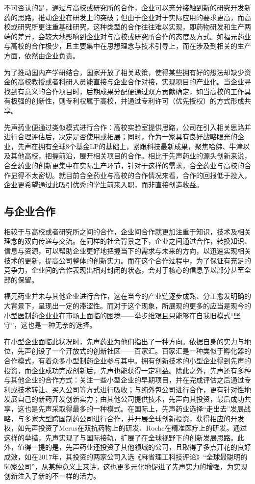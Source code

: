 \documentclass[twocolumn,openany]{ctexbook}
\begin{document}
			不可否认的是，通过与高校或研究所的合作，企业可以充分接触到新的研究开发新药的思路，推动企业在研发上的突破；但由于企业对于实际应用的要求更高，而高校或研究所更注重基础研究，这种类型的合作往往难以实现，即药物研发和生产两端的差异，会较大地影响到企业对与高校或研究所合作的态度及方式。如福元药业与高校的合作极少，且主要集中在思想理念与技术引导上，而在涉及到相关的生产方面，依然由企业负责。
			
			为了推动国内产学研结合，国家开放了相关政策，使得某些拥有好的想法却缺少资金的高校教授或者科研人员能直接与企业合作对接，实现项目的产业化。当企业寻找到有意义的合作项目时，后期成果分配便通过双方贡献确定，如当高校的工作具有极强的创新性，则专利权属于高校，并通过专利许可（优先授权）的方式形成共享。
			
			先声药业便通过类似模式进行合作：高校实验室提供思路，公司在引入相关思路并进行合理评估后，决定是否使用或拓展；同时，作为一家具有良好战略眼光的企业，先声在拥有全球8个基金LP的基础上，紧跟科技最新成果，聚焦哈佛、牛津以及其他高校，把握前沿，展开相关项目的合作。相比于先声药业的源头创新来说，合全药业的创新更集中在实际生产环节，针对于这样的需求，合全药业与高校的合作显得不太密切。就目前合全药业与高校的合作情况来看，合作的回报低于投入，企业更希望通过此吸引优秀的学生前来入职，而非直接创造收益。
			
			
			\subsection{与企业合作}
			
			相较于与高校或者研究所之间的合作，企业间合作就更加注重于知识，技术及相关理念的双向传递与交流。在同样的社会背景之下，企业之间通过合作，转换知识、信息与资源，可以帮助企业更好地把握当下的需求与未来的方向，以迅速实现相关技术的更新，提高公司整体的创新实力。而在这个合作过程中，为了保证有充足的竞争力，企业间的合作表现出相对封闭的状态，会对于核心的信息予以部分甚至全部的保留。
			
			福元药业并未与其他企业进行合作，这在当今的产业链逐步成熟、分工愈发明确的大背景下，呈现出一定的滞涩性。而对于这个现象，所展现的更多的应当是现今的小型医制药企业业在市场上面临的困境——举步维艰且只能够在自我旧模式“坚守”，这也是一种无奈的选择。
			
			在小型企业面临此状况时，先声药业为他们指出了一种方向。依据自身的实力与地位，先声创设了一个开放式的创新社区——百家汇。百家汇是一种类似于孵化器的合作模式，有着众多小型制药企业参与其中。拥有创新技术的小型企业得到先声的投资，而企业成功完成创新后，先声也能获得一定利益。除此之外，先声还有多种与其他企业的合作方式：关注一些小型企业的早期项目，并在完成评估之后通过专利或技术转让、买入公司等方式进行吸收；与纯外包公司进行合作，更有针对性地发展自己的新药开发创新实力；由其他公司提供技术，先声向其投资，最后成功共享，这也是先声采取得最多的一种模式。在国际上，先声药业选择“走出去”发展战略，与多家大型跨国制药公司进行合作，并开展全球创新投资，获得相应的开发权，如先声投资了Merus在双抗药物上的研发、Roche在精准医疗上的研发。通过这样的举措，先声实现了与国际接轨，扩展了在全球视野下的创新发展思路。此外，值得一提的是，先声药业还投资了其他领域的公司，且取得了多点开花的良好成效，如在2017年，其投资的两家公司入选《麻省理工科技评论》“全球最聪明的50家公司”，从某种意义上来讲，这也更多元化地促进了先声实力的增强，为实现创新注入了新的不一样的活力\citep{RN5}。
			
\end{document}
